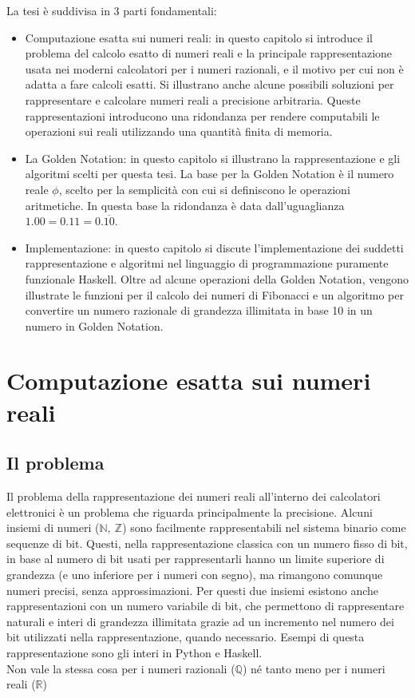 \documentclass[Lau]{sapthesis}
\begin{document}
La tesi è suddivisa in 3 parti fondamentali:
\begin{itemize}
\item Computazione esatta sui numeri reali: in questo capitolo si introduce il problema del calcolo esatto di numeri reali e la principale rappresentazione usata nei moderni calcolatori per i numeri razionali, e il motivo per cui non è adatta a fare calcoli esatti. Si illustrano anche alcune possibili soluzioni per rappresentare e calcolare numeri reali a precisione arbitraria. Queste rappresentazioni introducono una ridondanza per rendere computabili le operazioni sui reali utilizzando una quantità finita di memoria.
\item La Golden Notation: in questo capitolo si illustrano la rappresentazione e gli algoritmi scelti per questa tesi. La base per la Golden Notation è il numero reale $\phi$, scelto per la semplicità con cui si definiscono le operazioni aritmetiche. In questa base la ridondanza è data dall'uguaglianza $1.00 = 0.11 = 0.\overline{10}$.
\item Implementazione: in questo capitolo si discute l'implementazione dei suddetti rappresentazione e algoritmi nel linguaggio di programmazione puramente funzionale Haskell. Oltre ad alcune operazioni della Golden Notation, vengono illustrate le funzioni per il calcolo dei numeri di Fibonacci e un algoritmo per convertire un numero razionale di grandezza illimitata in base 10 in un numero in Golden Notation.
\end{itemize}



\chapter{Computazione esatta sui numeri reali}



\section{Il problema}
Il problema della rappresentazione dei numeri reali all'interno dei calcolatori elettronici è un problema che riguarda principalmente la precisione. Alcuni insiemi di numeri ($\mathbb{N},\ \mathbb{Z}$) sono 
facilmente rappresentabili nel sistema binario come sequenze di bit. Questi, nella rappresentazione classica con un numero fisso di bit, in 
base al numero di bit usati per rappresentarli hanno un limite superiore di 
grandezza (e uno inferiore per i numeri con segno), ma rimangono comunque numeri 
precisi, senza approssimazioni. Per questi due insiemi esistono anche rappresentazioni con un numero variabile di bit, che permettono di rappresentare naturali e interi di grandezza illimitata grazie ad un incremento nel numero dei bit utilizzati nella rappresentazione, quando necessario. Esempi di questa rappresentazione sono gli interi in Python e Haskell.\\Non vale la stessa cosa per i numeri razionali 
($\mathbb{Q}$) né tanto meno per i numeri reali ($\mathbb{R}$)
\end{document}

